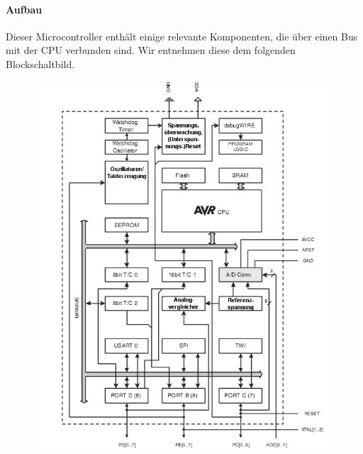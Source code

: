 \documentclass[11pt,a4paper]{scrartcl}
\begin{document}
\paragraph{Aufbau}
Dieser Microcontroller enthält einige relevante Komponenten, die über einen Bus mit der CPU verbunden sind. Wir entnehmen diese dem folgenden Blockschaltbild.
\begin{figure}[h!]
\centering
\includegraphics[scale=0.5]{b2-1.png}
\end{figure}
\end{document}
